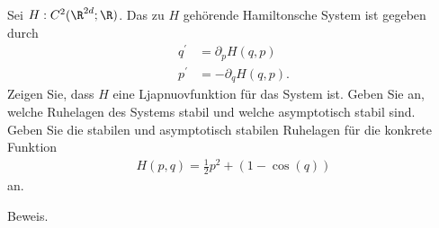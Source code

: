 \begin{exercise}
Sei $H: C^2(\R^{2d};\R)$. Das zu $H$ gehörende Hamiltonsche System ist gegeben durch
\begin{align*}
  q^{\prime} &= \partial_p H(q,p) \\
  p^{\prime} &= -\partial_q H(q,p).
\end{align*}
Zeigen Sie, dass $H$ eine Ljapnuovfunktion für das System ist. Geben Sie an, welche
Ruhelagen des Systems stabil und welche asymptotisch stabil sind. \\
Geben Sie die stabilen und asymptotisch stabilen Ruhelagen für die konkrete Funktion
\begin{align*}
  H(p,q) = \frac{1}{2}p^2 + (1 - \cos(q))
\end{align*}
an.
\end{exercise}
\begin{solution}
Beweis.
\end{solution}
